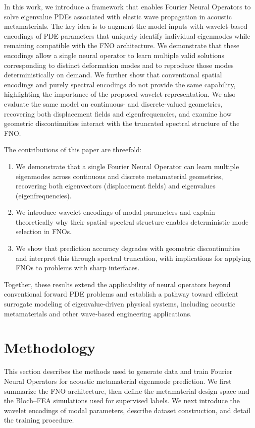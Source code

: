 \documentclass[preprint,review,12pt,numafflabel]{elsarticle}
\begin{document}
In this work, we introduce a framework that enables Fourier Neural Operators to solve eigenvalue PDEs associated with elastic wave propagation in acoustic metamaterials. The key idea is to augment the model inputs with wavelet-based encodings of PDE parameters that uniquely identify individual eigenmodes while remaining compatible with the FNO architecture. We demonstrate that these encodings allow a single neural operator to learn multiple valid solutions corresponding to distinct deformation modes and to reproduce those modes deterministically on demand. We further show that conventional spatial encodings and purely spectral encodings do not provide the same capability, highlighting the importance of the proposed wavelet representation. We also evaluate the same model on continuous- and discrete-valued geometries, recovering both displacement fields and eigenfrequencies, and examine how geometric discontinuities interact with the truncated spectral structure of the FNO.

The contributions of this paper are threefold:

\begin{enumerate}
    \item We demonstrate that a single Fourier Neural Operator can learn multiple eigenmodes across continuous and discrete metamaterial geometries, recovering both eigenvectors (displacement fields) and eigenvalues (eigenfrequencies).
    
    \item We introduce wavelet encodings of modal parameters and explain theoretically why their spatial--spectral structure enables deterministic mode selection in FNOs.
    
    \item We show that prediction accuracy degrades with geometric discontinuities and interpret this through spectral truncation, with implications for applying FNOs to problems with sharp interfaces.
\end{enumerate}

Together, these results extend the applicability of neural operators beyond conventional forward PDE problems and establish a pathway toward efficient surrogate modeling of eigenvalue-driven physical systems, including acoustic metamaterials and other wave-based engineering applications.

\section{Methodology}
\label{sec:Methodology}
This section describes the methods used to generate data and train Fourier Neural Operators for acoustic metamaterial eigenmode prediction. We first summarize the FNO architecture, then define the metamaterial design space and the Bloch--FEA simulations used for supervised labels. We next introduce the wavelet encodings of modal parameters, describe dataset construction, and detail the training procedure.
\end{document}
